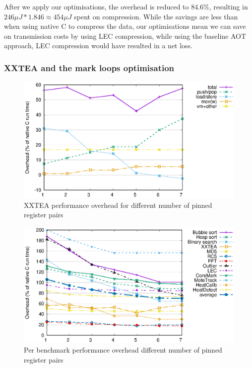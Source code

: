 After we apply our optimisations, the overhead is reduced to 84.6\%, resulting in $246 \mu J * 1.846 \approx 454 \mu J$ spent on compression. While the savings are less than when using native C to compress the data, our optimisations mean we can save on transmission costs by using LEC compression, while using the baseline AOT approach, LEC compression would have resulted in a net loss.

\subsubsection{XXTEA and the mark loops optimisation}

\begin{figure}
\centering
\includegraphics[width=\mygraphsize]{pinnedregs-performance-xxtea.eps}
\caption{XXTEA performance overhead for different number of pinned register pairs}
\label{fig-performance-pinnedregs-xxtea-per-opcode-category}
\end{figure}

\begin{figure}
\centering
\includegraphics[width=\mygraphsize]{pinnedregs-performance-all-benchmarks.eps}
\caption{Per benchmark performance overhead different number of pinned register pairs}
\label{fig-performance-pinnedregs-per-benchmark}
\end{figure}

